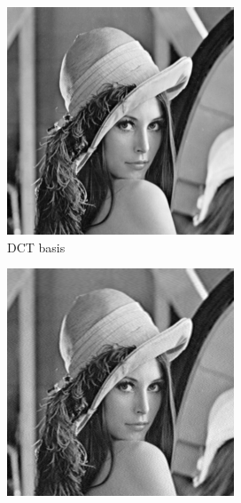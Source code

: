 \documentclass[12pt,english]{article}
\begin{document}
\begin{figure}
	\centering
	\begin{subfigure}[t]{0.3\textwidth}
		\centering
		\includegraphics[width=.9\textwidth]{img/lena}
		\caption{DCT basis}
		\label{fig:lenaoo}
	\end{subfigure}%
	\quad%
	\begin{subfigure}[t]{0.3\textwidth}
		\centering
		\includegraphics[width=.9\textwidth]{img/lena_new_t10}

\end{subfigure}
\end{figure}
\end{document}
